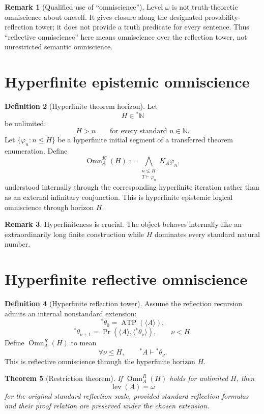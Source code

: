\documentclass[11pt]{article}
\theoremstyle{definition}
\newtheorem{definition}{Definition}[section]
\newtheorem{remark}[definition]{Remark}
\theoremstyle{plain}
\newtheorem{theorem}[definition]{Theorem}
\newcommand{\lev}{\operatorname{lev}}
\newcommand{\ATP}{\operatorname{ATP}}
\newcommand{\Prv}{\operatorname{Pr}}
\newcommand{\Omn}{\operatorname{Omn}}
\begin{document}
\begin{remark}[Qualified use of ``omniscience'']
Level $\omega$ is not truth-theoretic omniscience about oneself. It gives closure along the designated provability-reflection tower; it does not provide a truth predicate for every sentence. Thus ``reflective omniscience'' here means omniscience over the reflection tower, not unrestricted semantic omniscience.
\end{remark}

\section{Hyperfinite epistemic omniscience}

\begin{definition}[Hyperfinite theorem horizon]
Let
\[
H\in{}^*\mathbb N
\]
be unlimited:
\[
H>n\qquad\text{for every standard }n\in\mathbb N.
\]
Let $\{\varphi_n:n\le H\}$ be a hyperfinite initial segment of a transferred theorem enumeration. Define
\[
\Omn_A^K(H):=\bigwedge_{\substack{n\le H\\T\vdash\varphi_n}}K_A\varphi_n,
\]
understood internally through the corresponding hyperfinite iteration rather than as an external infinitary conjunction. This is hyperfinite epistemic logical omniscience through horizon $H$.
\end{definition}

\begin{remark}
Hyperfiniteness is crucial. The object behaves internally like an extraordinarily long finite construction while $H$ dominates every standard natural number.
\end{remark}

\section{Hyperfinite reflective omniscience}

\begin{definition}[Hyperfinite reflection tower]
Assume the reflection recursion admits an internal nonstandard extension:
\[
{}^*\theta_0=\ATP(\langle A\rangle),
\]
\[
{}^*\theta_{\nu+1}=\Prv(\langle A\rangle,\langle{}^*\theta_\nu\rangle),\qquad\nu<H.
\]
Define $\Omn_A^R(H)$ to mean
\[
\forall\nu\le H,\qquad{}^*A\vdash{}^*\theta_\nu.
\]
This is reflective omniscience through the hyperfinite horizon $H$.
\end{definition}

\begin{theorem}[Restriction theorem]
If $\Omn_A^R(H)$ holds for unlimited $H$, then
\[
\lev(A)=\omega
\]
for the original standard reflection scale, provided standard reflection formulas and their proof relation are preserved under the chosen extension.
\end{theorem}
\end{document}
